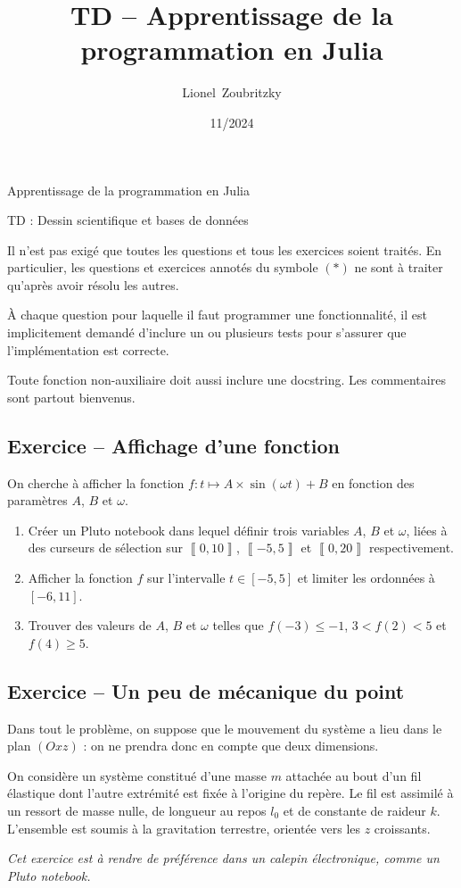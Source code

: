\documentclass{article}
\title{TD -- Apprentissage de la programmation en Julia}
\author{Lionel~Zoubritzky}
\date{11/2024}
\newcounter{loop}
\newcounter{numEx}
\newcommand{\exo}[1]{
	\stepcounter{numEx}
	\setcounter{loop}{0}
	\subsection*{Exercice \arabic{numEx} -- #1}
}
\newcommand{\llbra}{\left\llbracket}
\newcommand{\rrbra}{\right\rrbracket}
\renewcommand{\brack}[1]{\ensuremath{\llbra#1\rrbra}}
\begin{document}
	
\begin{center}
	\Large Apprentissage de la programmation en Julia
	
	TD  : Dessin scientifique et bases de données
	\vspace{2em}
\end{center}

Il n'est pas exigé que toutes les questions et tous les exercices soient traités. En particulier, les questions et exercices annotés du symbole $(*)$ ne sont à traiter qu'après avoir résolu les autres.

À chaque question pour laquelle il faut programmer une fonctionnalité, il est implicitement demandé d'inclure un ou plusieurs tests pour s'assurer que l'implémentation est correcte.

Toute fonction non-auxiliaire doit aussi inclure une docstring. Les commentaires sont partout bienvenus.

\exo{Affichage d'une fonction}

On cherche à afficher la fonction $f:t\mapsto A\times\sin(\omega t) + B$ en fonction des paramètres $A$, $B$ et $\omega$.

\begin{enumerate}
	\item Créer un Pluto notebook dans lequel définir trois variables $A$, $B$ et $\omega$, liées à des curseurs de sélection sur $\brack{0, 10}$, $\brack{-5, 5}$ et $\brack{0, 20}$ respectivement.
	\item Afficher la fonction $f$ sur l'intervalle $t\in\left[-5, 5\right]$ et limiter les ordonnées à $\left[-6, 11\right]$.
	\item Trouver des valeurs de $A$, $B$ et $\omega$ telles que $f(-3) \le -1$, $3 < f(2) < 5$ et $f(4) \ge 5$.
\end{enumerate}

\exo{Un peu de mécanique du point}

Dans tout le problème, on suppose que le mouvement du système a lieu dans le plan $(Oxz)$ : on ne prendra donc en compte que deux dimensions.

On considère un système constitué d'une masse $m$ attachée au bout d'un fil élastique dont l'autre extrémité est fixée à l'origine du repère. Le fil est assimilé à un ressort de masse nulle, de longueur au repos $l_0$ et de constante de raideur $k$. L'ensemble est soumis à la gravitation terrestre, orientée vers les $z$ croissants.

\textsl{Cet exercice est à rendre de préférence dans un calepin électronique, comme un Pluto notebook.}
\end{document}
